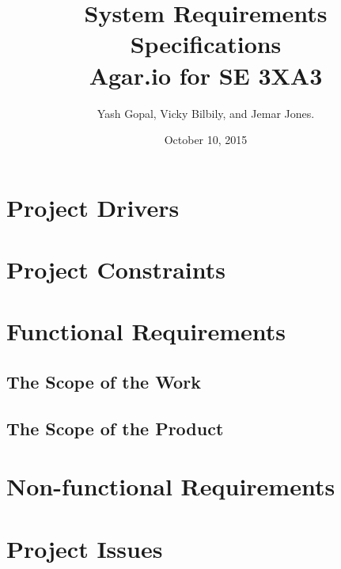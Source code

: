 \documentclass[12pt]{article}
\title{System Requirements Specifications\\
	\large Agar.io for SE 3XA3}
\author{Yash Gopal, Vicky Bilbily, and Jemar Jones.}
\date{October 10, 2015}
\begin{document}
\maketitle
\tableofcontents
\newpage

\section{Project Drivers}
\section{Project Constraints}
\section{Functional Requirements}
\subsection{The Scope of the Work}
\subsection{The Scope of the Product}
\section{Non-functional Requirements}
\section{Project Issues}
\end{document}
